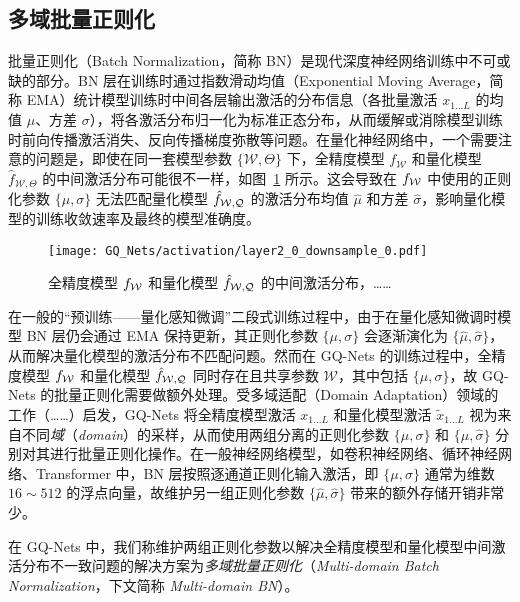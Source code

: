 \subsection{多域批量正则化}
批量正则化（Batch Normalization，简称 BN）是现代深度神经网络训练中不可或缺的部分。BN 层在训练时通过指数滑动均值（Exponential Moving Average，简称 EMA）统计模型训练时中间各层输出激活的分布信息（各批量激活 $x_{1\ldots L}$ 的均值 $\mu$、方差 $\sigma$），将各激活分布归一化为标准正态分布，从而缓解或消除模型训练时前向传播激活消失、反向传播梯度弥散等问题。在量化神经网络中，一个需要注意的问题是，即使在同一套模型参数 $\{\mathcal{W}, \Theta\}$ 下，全精度模型 $f_{\mathcal{W}}$ 和量化模型 $\hat{f}_{\mathcal{W}, \Theta}$ 的中间激活分布可能很不一样，如图~\ref{img::gq_nets::fp_q_act_dist} 所示。这会导致在 $f_{\mathcal{W}}$ 中使用的正则化参数 $\{\mu, \sigma\}$ 无法匹配量化模型 $\hat{f}_{\mathcal{W, Q}}$ 的激活分布均值 $\hat{\mu}$ 和方差 $\hat{\sigma}$，影响量化模型的训练收敛速率及最终的模型准确度。

\begin{figure}[htb]
  \centering
  \texttt{[image: GQ\_Nets/activation/layer2\_0\_downsample\_0.pdf]}
  \caption{全精度模型 $f_{\mathcal{W}}$ 和量化模型 $\hat{f}_{\mathcal{W, Q}}$ 的中间激活分布，……}
  \label{img::gq_nets::fp_q_act_dist}
\end{figure}

在一般的“预训练——量化感知微调”二段式训练过程中，由于在量化感知微调时模型 BN 层仍会通过 EMA 保持更新，其正则化参数 $\{\mu, \sigma\}$ 会逐渐演化为 $\{\hat{\mu}, \hat{\sigma}\}$，从而解决量化模型的激活分布不匹配问题。然而在 GQ-Nets 的训练过程中，全精度模型 $f_{\mathcal{W}}$ 和量化模型 $\hat{f}_{\mathcal{W, Q}}$ 同时存在且共享参数 $\mathcal{W}$，其中包括 $\{\mu, \sigma\}$，故 GQ-Nets 的批量正则化需要做额外处理。受多域适配（Domain Adaptation）领域的工作（……）启发，GQ-Nets 将全精度模型激活 $x_{1\ldots L}$ 和量化模型激活 $\tilde{x}_{1\ldots L}$ 视为来自不同\emph{域}（\emph{domain}）的采样，从而使用两组分离的正则化参数 $\{\mu, \sigma\}$ 和 $\{\hat{\mu}, \hat{\sigma}\}$ 分别对其进行批量正则化操作。在一般神经网络模型，如卷积神经网络、循环神经网络、Transformer 中，BN 层按照逐通道正则化输入激活，即 $\{\mu, \sigma\}$ 通常为维数 $16\sim 512$ 的浮点向量，故维护另一组正则化参数 $\{\hat{\mu}, \hat{\sigma}\}$ 带来的额外存储开销非常少。

在 GQ-Nets 中，我们称维护两组正则化参数以解决全精度模型和量化模型中间激活分布不一致问题的解决方案为\emph{多域批量正则化}（\emph{Multi-domain Batch Normalization}，下文简称 \emph{Multi-domain BN}）。
